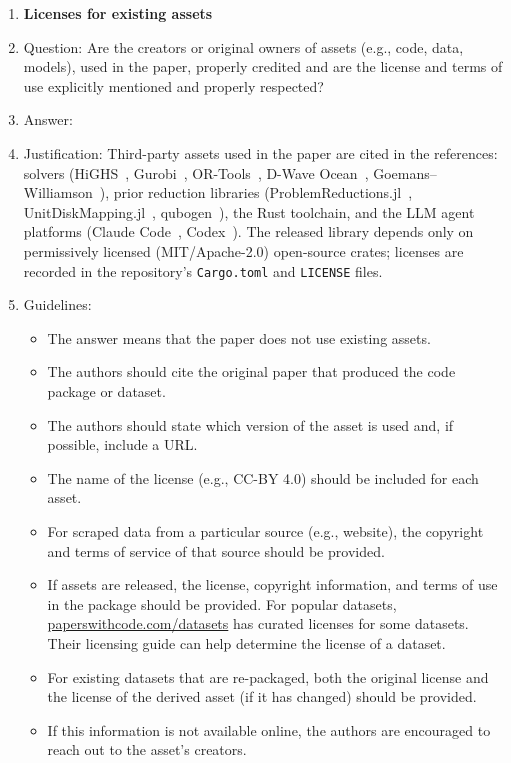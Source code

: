 \begin{enumerate}
\item {\bf Licenses for existing assets}
    \item[] Question: Are the creators or original owners of assets (e.g., code, data, models), used in the paper, properly credited and are the license and terms of use explicitly mentioned and properly respected?
    \item[] Answer: \answerYes{}
    \item[] Justification: Third-party assets used in the paper are cited in the references: solvers (HiGHS~\cite{Huangfu2018HiGHS}, Gurobi~\cite{Gurobi2026}, OR-Tools~\cite{Perron2024ORTools}, D-Wave Ocean~\cite{DWaveOcean2026}, Goemans--Williamson~\cite{GoemansWilliamson1995}), prior reduction libraries (ProblemReductions.jl~\cite{gao2025programming}, UnitDiskMapping.jl~\cite{Nguyen2023UnitDiskMapping}, qubogen~\cite{Tamura2020qubogen}), the Rust toolchain, and the LLM agent platforms (Claude Code~\cite{Anthropic2025ClaudeCode}, Codex~\cite{OpenAI2026Codex}). The released library depends only on permissively licensed (MIT/Apache-2.0) open-source crates; licenses are recorded in the repository's \texttt{Cargo.toml} and \texttt{LICENSE} files.
    \item[] Guidelines:
    \begin{itemize}
        \item The answer \answerNA{} means that the paper does not use existing assets.
        \item The authors should cite the original paper that produced the code package or dataset.
        \item The authors should state which version of the asset is used and, if possible, include a URL.
        \item The name of the license (e.g., CC-BY 4.0) should be included for each asset.
        \item For scraped data from a particular source (e.g., website), the copyright and terms of service of that source should be provided.
        \item If assets are released, the license, copyright information, and terms of use in the package should be provided. For popular datasets, \url{paperswithcode.com/datasets} has curated licenses for some datasets. Their licensing guide can help determine the license of a dataset.
        \item For existing datasets that are re-packaged, both the original license and the license of the derived asset (if it has changed) should be provided.
        \item If this information is not available online, the authors are encouraged to reach out to the asset's creators.
    \end{itemize}


\end{enumerate}

